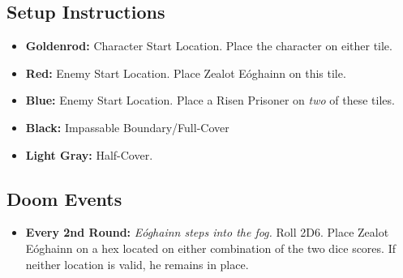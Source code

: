 \subsection*{Setup Instructions}
\begin{itemize}
\item \textbf{Goldenrod:} Character Start Location. Place the character on either tile.
\item \textbf{Red:} Enemy Start Location. Place Zealot Eóghainn on this tile.
\item \textbf{Blue:} Enemy Start Location. Place a Risen Prisoner on \emph{two} of these tiles.
\item \textbf{Black:} Impassable Boundary/Full-Cover
\item \textbf{Light Gray:} Half-Cover.
\end{itemize}

\pagebreak

\begin{tcolorbox}
\subsection*{Doom Events}
\begin{itemize}
\item \textbf{Every 2nd Round:} \emph{Eóghainn steps into the fog.} Roll 2D6. Place Zealot Eóghainn on a hex located on either combination of the two dice scores. If neither location is valid, he remains in place.
\end{itemize}
\end{tcolorbox}

